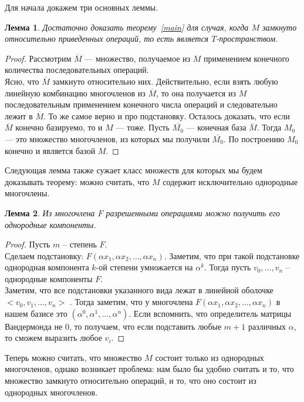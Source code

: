 \documentclass[12pt,a4paper]{article}
\newtheorem{lemma}{Лемма}[section]
\begin{document}
    Для начала докажем три основных леммы.\vskip 0.1in\noindent
    \begin{lemma}
        \label{closure}
        Достаточно доказать теорему~\ref{main} для случая, когда $M$ замкнуто относительно приведенных операций, то есть является $T$-пространством.
    \end{lemma}
    \begin{proof}
        Рассмотрим $\overline{M}$ --- множество, получаемое из $M$ применением конечного количества последовательных операций.\\
        Ясно, что $\overline{M}$ замкнуто относительно них. Действительно, если взять любую линейную комбинацию многочленов из $\overline{M}$, то она получается из $M$ последовательным применением конечного числа операций и следовательно лежит в $\overline{M}$. То же самое верно и про подстановку.
        Осталось доказать, что если $\overline{M}$ конечно базируемо, то и $M$ --- тоже. Пусть $\overline{M_0}$ --- конечная база $\overline{M}$. Тогда $M_0$ --- это множество многочленов, из которых мы получили $\overline{M_0}$. По построению $M_0$ конечно и является базой $M$.
    \end{proof}
    Следующая лемма также сужает класс множеств для которых мы будем доказывать теорему: можно считать, что $M$ содержит исключительно однородные многочлены.\vskip 0.1in\noindent
    \begin{lemma}
        \label{homogen}
        Из многочлена $F$ разрешенными операциями можно получить его однородные компоненты.
    \end{lemma}
    \begin{proof}
        Пусть $m$ -- степень $F$.\\
        Сделаем подстановку: $F(\alpha x_1, \alpha x_2, \ldots, \alpha x_n)$. Заметим, что при такой подстановке однородная компонента $k$-ой степени умножается на $\alpha^k$. Тогда пусть $v_0,\ldots,v_n$ -- однородные компоненты $F$. \\
        Заметим, что все подстановки указанного вида лежат в линейной оболочке $<v_0,v_1,\ldots,v_n>$ . Тогда заметим, что у многочлена $F(\alpha x_1, \alpha x_2, \ldots, \alpha x_n)$ в нашем базисе это $(\alpha^0,\alpha^1,\ldots,\alpha^n)$. Если вспомнить, что определитель матрицы Вандермонда не $0$, то получаем, что если подставить любые $m+1$ различных $\alpha$, то сможем выразить любое $v_i$.
    \end{proof}
    Теперь можно считать, что множество $M$ состоит только из однородных многочленов, однако возникает проблема: нам было бы удобно считать и то, что множество замкнуто относительно операций, и то, что оно состоит из однородных многочленов.
\end{document}
